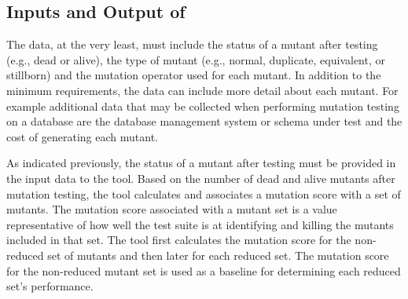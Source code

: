 \subsection{Inputs and Output of \mr}

The data, at the very least, must  include the status of
a mutant after testing (e.g., dead or alive), the type of mutant (e.g., normal, duplicate, equivalent, or stillborn)
and the mutation operator used for each mutant. In addition to the minimum requirements, the data can include
more detail about each mutant. For example additional data that may be collected when performing mutation testing
on a database are the database
management system or schema under test and the cost of generating each mutant.

As indicated previously, the status of a mutant after testing must be provided
in the input data to the \mr tool.
Based on the number of dead and alive mutants after mutation testing,
the \mr tool calculates and associates a mutation score with a set of mutants.
The mutation score associated with a mutant set is a value representative of how well
the test suite is at identifying and killing the mutants included in that set.
The \mr tool first calculates the
mutation score for the non-reduced set of mutants and then later for each reduced set. The mutation
score for the non-reduced mutant set is used as a baseline for determining
each reduced set's performance.
